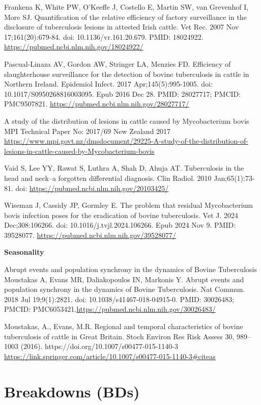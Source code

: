 \documentclass[
  letterpaper,
  DIV=11,
  numbers=noendperiod]{scrreprt}
\begin{document}
Frankena K, White PW, O'Keeffe J, Costello E, Martin SW, van Grevenhof
I, More SJ. Quantification of the relative efficiency of factory
surveillance in the disclosure of tuberculosis lesions in attested Irish
cattle. Vet Rec. 2007 Nov 17;161(20):679-84. doi: 10.1136/vr.161.20.679.
PMID: 18024922. \url{https://pubmed.ncbi.nlm.nih.gov/18024922/}

Pascual-Linaza AV, Gordon AW, Stringer LA, Menzies FD. Efficiency of
slaughterhouse surveillance for the detection of bovine tuberculosis in
cattle in Northern Ireland. Epidemiol Infect. 2017 Apr;145(5):995-1005.
doi: 10.1017/S0950268816003095. Epub 2016 Dec 28. PMID: 28027717; PMCID:
PMC9507821. \url{https://pubmed.ncbi.nlm.nih.gov/28027717/}

A study of the distribution of lesions in cattle caused by Mycobacterium
bovis MPI Technical Paper No: 2017/69 New Zealand 2017
\url{https://www.mpi.govt.nz/dmsdocument/29225-A-study-of-the-distribution-of-lesions-in-cattle-caused-by-Mycobacterium-bovis}

Vaid S, Lee YY, Rawat S, Luthra A, Shah D, Ahuja AT. Tuberculosis in the
head and neck--a forgotten differential diagnosis. Clin Radiol. 2010
Jan;65(1):73-81. doi: \url{https://pubmed.ncbi.nlm.nih.gov/20103425/}

Wiseman J, Cassidy JP, Gormley E. The problem that residual
Mycobacterium bovis infection poses for the eradication of bovine
tuberculosis. Vet J. 2024 Dec;308:106266. doi:
10.1016/j.tvjl.2024.106266. Epub 2024 Nov 9. PMID: 39528077.
\url{https://pubmed.ncbi.nlm.nih.gov/39528077/}

\textbf{Seasonality}

Abrupt events and population synchrony in the dynamics of Bovine
Tuberculosis Moustakas A, Evans MR, Daliakopoulos IN, Markonis Y. Abrupt
events and population synchrony in the dynamics of Bovine Tuberculosis.
Nat Commun. 2018 Jul 19;9(1):2821. doi: 10.1038/s41467-018-04915-0.
PMID: 30026483; PMCID:
PMC6053421.\url{https://pubmed.ncbi.nlm.nih.gov/30026483/}

Moustakas, A., Evans, M.R. Regional and temporal characteristics of
bovine tuberculosis of cattle in Great Britain. Stoch Environ Res Risk
Assess 30, 989--1003 (2016). https://doi.org/10.1007/s00477-015-1140-3
\url{https://link.springer.com/article/10.1007/s00477-015-1140-3\#citeas}

\part{Breakdowns (BDs)}
\end{document}
